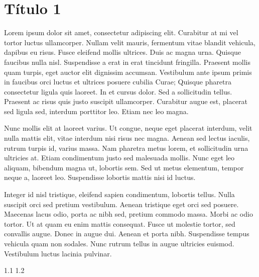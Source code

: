\chapter{Título 1}
Lorem ipsum dolor sit amet, consectetur adipiscing elit. Curabitur at mi vel tortor luctus ullamcorper. Nullam velit mauris, fermentum vitae blandit vehicula, dapibus eu risus. Fusce eleifend mollis ultrices. Duis ac magna urna. Quisque faucibus nulla nisl. Suspendisse a erat in erat tincidunt fringilla. Praesent mollis quam turpis, eget auctor elit dignissim accumsan. Vestibulum ante ipsum primis in faucibus orci luctus et ultrices posuere cubilia Curae; Quisque pharetra consectetur ligula quis laoreet. In et cursus dolor. Sed a sollicitudin tellus. Praesent ac risus quis justo suscipit ullamcorper. Curabitur augue est, placerat sed ligula sed, interdum porttitor leo. Etiam nec leo magna.

Nunc mollis elit at laoreet varius. Ut congue, neque eget placerat interdum, velit nulla mattis elit, vitae interdum nisi risus nec magna. Aenean sed lectus iaculis, rutrum turpis id, varius massa. Nam pharetra metus lorem, et sollicitudin urna ultricies at. Etiam condimentum justo sed malesuada mollis. Nunc eget leo aliquam, bibendum magna ut, lobortis sem. Sed ut metus elementum, tempor neque a, laoreet leo. Suspendisse lobortis mattis nisi id luctus.

Integer id nisl tristique, eleifend sapien condimentum, lobortis tellus. Nulla suscipit orci sed pretium vestibulum. Aenean tristique eget orci sed posuere. Maecenas lacus odio, porta ac nibh sed, pretium commodo massa. Morbi ac odio tortor. Ut at quam eu enim mattis consequat. Fusce ut molestie tortor, sed convallis augue. Donec in augue dui. Aenean et porta nibh. Suspendisse tempus vehicula quam non sodales. Nunc rutrum tellus in augue ultricies euismod. Vestibulum luctus lacinia pulvinar.

{1.1}
{1.2}